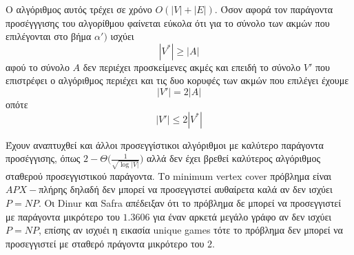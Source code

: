 Ο αλγόριθμος αυτός τρέχει σε χρόνο $O(|V| + |E|)$. Όσον αφορά τον παράγοντα προσέγγγισης του αλγορίθμου φαίνεται εύκολα ότι για το σύνολο των ακμών που επιλέγονται στο βήμα $\alpha')$ ισχύει 
$$|V^{*}| \geq |A|$$ 
αφού το σύνολο $Α$ δεν περιέχει προσκείμενες ακμές και επειδή το σύνολο $V'$ που επιστρέφει ο αλγόριθμος περιέχει και τις δυο κορυφές των ακμών που επιλέγει έχουμε 
$$|V'| = 2|A|$$ 
οπότε 
$$|V'| \leq 2|V^{*}|$$ 

Έχουν αναπτυχθεί και άλλοι προσεγγίστικοι αλγόριθμοι με καλύτερο παράγοντα προσέγγισης, όπως $2-\Theta\Big(\frac{1}{\sqrt{\log{|V|}}}\Big)$ αλλά δεν έχει βρεθεί καλύτερος αλγόριθμος σταθερού προσεγγιστικού παράγοντα. Το minimum vertex cover πρόβλημα είναι $APX-$πλήρης δηλαδή δεν μπορεί να προσεγγιστεί αυθαίρετα καλά αν δεν ισχύει $P=NP$. Οι Dinur και Safra απέδειξαν ότι το πρόβλημα δε μπορεί να προσεγγιστεί με παράγοντα μικρότερο του $1.3606$ για έναν αρκετά μεγάλο γράφο αν δεν ισχύει $P=NP$, επίσης αν ισχυέι η εικασία unique games τότε το πρόβλημα δεν μπορεί να προσεγγιστεί με σταθερό πράγοντα μικρότερο του $2$.